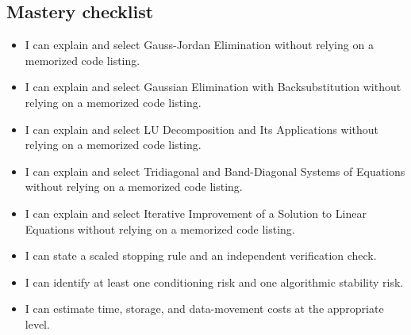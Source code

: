 \documentclass[10pt,letterpaper]{article}
\begin{document}
\subsection*{Mastery checklist}
\begin{itemize}
\item[$\square$] I can explain and select Gauss-Jordan Elimination without relying on a memorized code listing.
\item[$\square$] I can explain and select Gaussian Elimination with Backsubstitution without relying on a memorized code listing.
\item[$\square$] I can explain and select LU Decomposition and Its Applications without relying on a memorized code listing.
\item[$\square$] I can explain and select Tridiagonal and Band-Diagonal Systems of Equations without relying on a memorized code listing.
\item[$\square$] I can explain and select Iterative Improvement of a Solution to Linear Equations without relying on a memorized code listing.
\item[$\square$] I can state a scaled stopping rule and an independent verification check.
\item[$\square$] I can identify at least one conditioning risk and one algorithmic stability risk.
\item[$\square$] I can estimate time, storage, and data-movement costs at the appropriate level.
\end{itemize}
\end{document}

